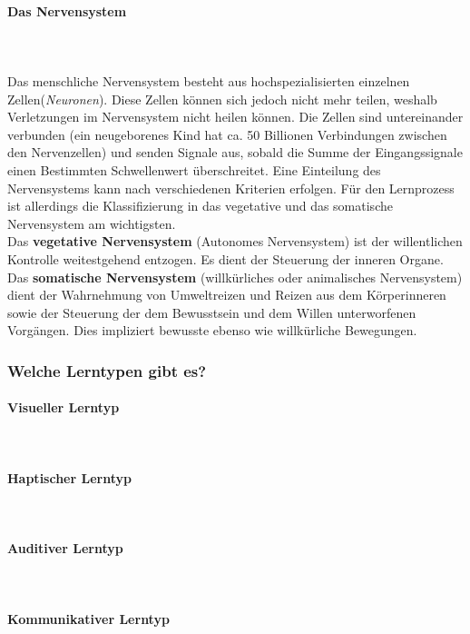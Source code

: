 \paragraph{Das Nervensystem}~\\
\\
Das menschliche Nervensystem besteht aus hochspezialisierten einzelnen Zellen({\it Neuronen}). Diese Zellen können sich jedoch nicht mehr teilen, weshalb Verletzungen im Nervensystem nicht heilen können. Die Zellen sind untereinander verbunden (ein neugeborenes Kind hat ca. 50 Billionen Verbindungen zwischen den Nervenzellen) und senden Signale aus, sobald die Summe der Eingangssignale einen Bestimmten Schwellenwert überschreitet. Eine Einteilung des Nervensystems kann nach verschiedenen Kriterien erfolgen. Für den Lernprozess ist allerdings die Klassifizierung in das vegetative und das somatische Nervensystem am wichtigsten.\\
Das {\bf vegetative Nervensystem} (Autonomes Nervensystem) ist der willentlichen Kontrolle weitestgehend entzogen. Es dient der Steuerung der inneren Organe.\\
Das {\bf somatische Nervensystem} (willkürliches oder animalisches Nervensystem) dient der Wahrnehmung von Umweltreizen und Reizen aus dem Körperinneren sowie der Steuerung der dem Bewusstsein und dem Willen unterworfenen Vorgängen. Dies impliziert bewusste ebenso wie willkürliche Bewegungen.

\subsubsection{Welche Lerntypen gibt es?}

\paragraph{Visueller Lerntyp}~\\
\paragraph{Haptischer Lerntyp}~\\
\paragraph{Auditiver Lerntyp}~\\
\paragraph{Kommunikativer Lerntyp}~\\


